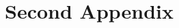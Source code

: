 \documentclass[hidelinks,pdftex,phd]{pittetd}
\begin{document}
\chapter{Second Appendix}




\end{document}
